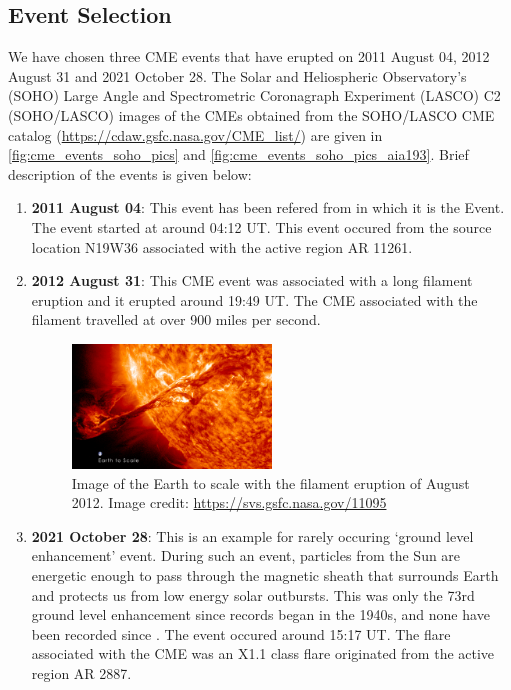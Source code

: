 \subsection{Event Selection}
\label{sec:selection_of_events}

We have chosen three CME events that have erupted on 2011 August 04, 2012 August 31 and 2021 October 28. The Solar and Heliospheric Observatory's  (SOHO) Large Angle and Spectrometric Coronagraph Experiment (LASCO) C2 (SOHO/LASCO) images of the CMEs obtained from the SOHO/LASCO CME catalog (\url{https://cdaw.gsfc.nasa.gov/CME_list/}) are given in \cref{fig:cme_events_soho_pics} and \cref{fig:cme_events_soho_pics_aia193}. Brief description of the events is given below:\\

\begin{enumerate}

        \item\textbf{2011 August 04}: This event has been refered from \citep{Mason2016} in which it is the  Event. The event started at around 04:12 UT. This event occured from the source location N19W36 associated with the active region AR 11261.

        \item\textbf{2012 August 31}: This CME event was associated with a long filament eruption and it erupted around 19:49 UT. The CME associated with the filament travelled at over 900 miles per second.

    \begin{figure}[ht]
        \centering
        \includegraphics[width=0.5\textwidth]{images/aug_31_2012_event_sun_earth_image.jpg}
        \caption[Image of the Earth to scale of the 2012 August]{Image of the Earth to scale with the filament eruption of  August 2012. Image credit: \url{https://svs.gsfc.nasa.gov/11095}}
        \label{fig:sun_earth_aug_31_2012}
    \end{figure}

        \item\textbf{2021 October 28}: This is an example for rarely occuring `ground level enhancement' event. During such an event, particles from the Sun are energetic enough to pass through the magnetic sheath that surrounds Earth and protects us from low energy solar outbursts. This was only the 73rd ground level enhancement since records began in the 1940s, and none have been recorded since \citep{Klein2022}. The event occured around 15:17 UT. The flare associated with the CME was an X1.1 class flare originated from the active region AR 2887.\\

\end{enumerate}

